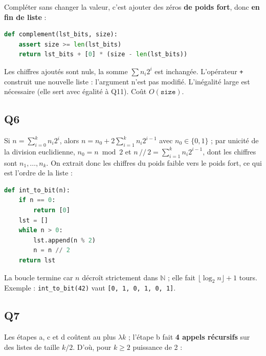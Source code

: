 \documentclass[11pt,a4paper]{article}
\newcommand{\equationajustee}[1]{%
  \sbox{\boiteequation}{$\displaystyle #1$}%
  \ifdim\wd\boiteequation>\linewidth
    \[\resizebox{\linewidth}{!}{\usebox{\boiteequation}}\]%
  \else
    \[#1\]%
  \fi}
\begin{document}
Compléter sans changer la valeur, c'est ajouter des zéros \textbf{de poids fort}, donc \textbf{en fin de liste} :

\begin{lstlisting}[language=Python]
def complement(lst_bits, size):
    assert size >= len(lst_bits)
    return lst_bits + [0] * (size - len(lst_bits))
\end{lstlisting}

Les chiffres ajoutés sont nuls, la somme \(\sum n_i 2^i\) est inchangée. L'opérateur \texttt{+} construit une nouvelle liste : l'argument n'est pas modifié. L'inégalité large est nécessaire (elle sert avec égalité à Q11). Coût \(O(\texttt{size})\).

\hypertarget{q6}{%
\subsection{Q6}\label{q6}}

Si \(n = \sum_{i=0}^{k} n_i 2^i\), alors \(n = n_0 + 2 \sum_{i=1}^{k} n_i 2^{i-1}\) avec \(n_0 \in \{0,1\}\) ; par unicité de la division euclidienne, \(n_0 = n \bmod 2\) et \(n \,//\, 2 = \sum_{i=1}^{k} n_i 2^{i-1}\), dont les chiffres sont \(n_1, \dots, n_k\). On extrait donc les chiffres du poids faible vers le poids fort, ce qui est l'ordre de la liste :

\begin{lstlisting}[language=Python]
def int_to_bit(n):
    if n == 0:
        return [0]
    lst = []
    while n > 0:
        lst.append(n % 2)
        n = n // 2
    return lst
\end{lstlisting}

La boucle termine car \(n\) décroît strictement dans \(\mathbb{N}\) ; elle fait \(\lfloor \log_2 n \rfloor + 1\) tours. Exemple : \texttt{int\_to\_bit(42)} vaut \texttt{{[}0,\allowbreak{}\ 1,\allowbreak{}\ 0,\allowbreak{}\ 1,\allowbreak{}\ 0,\allowbreak{}\ 1{]}\allowbreak{}}.

\hypertarget{q7}{%
\subsection{Q7}\label{q7}}

Les étapes a, c et d coûtent au plus \(\lambda k\) ; l'étape b fait \textbf{4 appels récursifs} sur des listes de taille \(k/2\). D'où, pour \(k \ge 2\) puissance de 2 :

\equationajustee{\begin{aligned}
C(k) &= 4\,C(k/2) + \lambda k, \\
C(1) &= c_0.
\end{aligned}}
\end{document}
